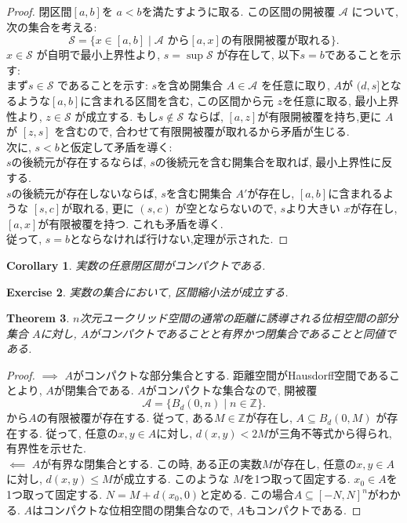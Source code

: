 \documentclass[dvipdfmx]{jbook}
\newtheorem{theorem}{Theorem}[section]
\newtheorem{corollary}[theorem]{Corollary}
\theoremstyle{remark}
\theoremstyle{plain}
\newtheorem{exercise}[theorem]{Exercise}
\begin{document}
\begin{proof}
	閉区間$[a,b]$を $a<b$を満たすように取る. この区間の開被覆 $\mathcal{A}$ について, 次の集合を考える:
	\[
		\mathcal{S} = \{ x \in [a,b]  \mid  \text{$\mathcal{A}$ から$[a,x]$の有限開被覆が取れる}\} 
	.\] 
	$x \in \mathcal{S}$ が自明で最小上界性より, $s = \sup \mathcal{S}$ が存在して, 以下$s =b$であることを示す:\\
	まず$s \in \mathcal{S}$ であることを示す: $s$を含め開集合 $A\in \mathcal{A}$ を任意に取り, $A$が $(d,s]$となるような$[a,b]$に含まれる区間を含む, この区間から元 $z$を任意に取る, 最小上界性より,  $z \in \mathcal{S}$ が成立する. もし$s \not\in \mathcal{S}$ ならば, $[a,z]$が有限開被覆を持ち,更に $A$が $[z,s]$ を含むので, 合わせて有限開被覆が取れるから矛盾が生じる.\\
	次に, $s <b$と仮定して矛盾を導く: \\
	 $s$の後続元が存在するならば,  $s$の後続元を含む開集合を取れば, 最小上界性に反する.\\
	 $s$の後続元が存在しないならば,  $s$を含む開集合 $A'$が存在し,  $[a,b]$に含まれるような $[s,c]$が取れる, 更に $\left( s,c \right) $ が空とならないので, $s$より大きい $x$が存在し,  $[a,x]$が有限被覆を持つ. これも矛盾を導く. \\
	 従って,  $s=b$とならなければ行けない,定理が示された.
\end{proof}

\begin{corollary}
	実数の任意閉区間がコンパクトである.
\end{corollary}

\begin{exercise}
	実数の集合において, 区間縮小法が成立する.
\end{exercise}


\begin{theorem}
	$n$次元ユークリッド空間の通常の距離に誘導される位相空間の部分集合 $A$に対し,  $A$がコンパクトであることと有界かつ閉集合であることと同値である.
\end{theorem}

\begin{proof}
	$\implies$ $A$がコンパクトな部分集合とする. 距離空間がHausdorff空間であることより,  $A$が閉集合である.   $A$がコンパクトな集合なので, 開被覆
	 \[
	 \mathcal{A}= \{ B_d \left( 0, n \right)  \mid  n \in \mathbb{Z}\} 
	 .\]
	 から$A$の有限被覆が存在する. 従って, ある$M \in \mathbb{Z}$が存在し, $A \subseteq  B_d\left( 0,M \right) $ が存在する. 従って, 任意の$x,y \in A$に対し,  $d(x,y) < 2M$が三角不等式から得られ, 有界性を示せた.\\
	 $\impliedby$ $A$が有界な閉集合とする. この時, ある正の実数$M$が存在し,  任意の$x, y \in A$に対し,  $d(x,y) \le M$が成立する. このような $M$を1つ取って固定する. $x_0 \in A$を1つ取って固定する.
	 $N = M + d(x_0, 0)$と定める. この場合$A \subseteq [-N, N]^n$がわかる. 
	 $A$はコンパクトな位相空間の閉集合なので,  $A$もコンパクトである.
\end{proof}
\end{document}
